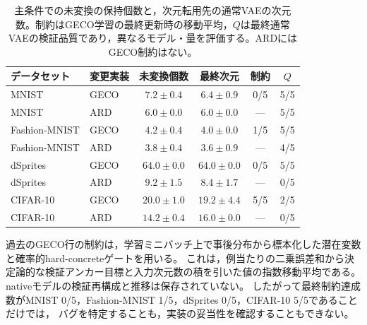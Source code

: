 \documentclass[11pt,a4paper]{ltjsarticle}
\begin{document}
\begin{table}[H]
\caption{主条件での未変換の保持個数と，次元転用先の通常VAEの次元数。制約はGECO学習の最終更新時の移動平均，$Q$は最終通常VAEの検証品質であり，異なるモデル・量を評価する。ARDにはGECO制約はない。}\label{tab:pruning}
\footnotesize
\setlength{\tabcolsep}{3.5pt}
\begin{tabular*}{\textwidth}{@{\extracolsep{\fill}}llcccc@{}}
\toprule
データセット & 変更実装 & 未変換個数 & 最終次元 & 制約 & $Q$ \\
\midrule
MNIST & GECO & $7.2 \pm 0.4$ & $6.4 \pm 0.9$ & 0/5 & 5/5 \\
MNIST & ARD & $6.0 \pm 0.0$ & $6.0 \pm 0.0$ & --- & 5/5 \\
Fashion-MNIST & GECO & $4.2 \pm 0.4$ & $4.0 \pm 0.0$ & 1/5 & 5/5 \\
Fashion-MNIST & ARD & $3.8 \pm 0.4$ & $3.6 \pm 0.9$ & --- & 4/5 \\
dSprites & GECO & $64.0 \pm 0.0$ & $64.0 \pm 0.0$ & 0/5 & 5/5 \\
dSprites & ARD & $9.2 \pm 1.5$ & $8.4 \pm 1.7$ & --- & 0/5 \\
CIFAR-10 & GECO & $20.0 \pm 1.0$ & $19.2 \pm 4.4$ & 5/5 & 2/5 \\
CIFAR-10 & ARD & $14.2 \pm 0.4$ & $16.0 \pm 0.0$ & --- & 0/5 \\
\bottomrule
\end{tabular*}
\end{table}

過去のGECO行の制約は，学習ミニバッチ上で事後分布から標本化した潜在変数と確率的hard-concreteゲートを用いる。
これは，例当たりの二乗誤差和から決定論的な検証アンカー目標と入力次元数の積を引いた値の指数移動平均である。
nativeモデルの検証再構成と推移は保存されていない。
したがって最終制約達成数がMNIST 0/5，Fashion-MNIST 1/5，dSprites 0/5，CIFAR-10 5/5であることだけでは，
バグを特定することも，実装の妥当性を確認することもできない。
\end{document}
